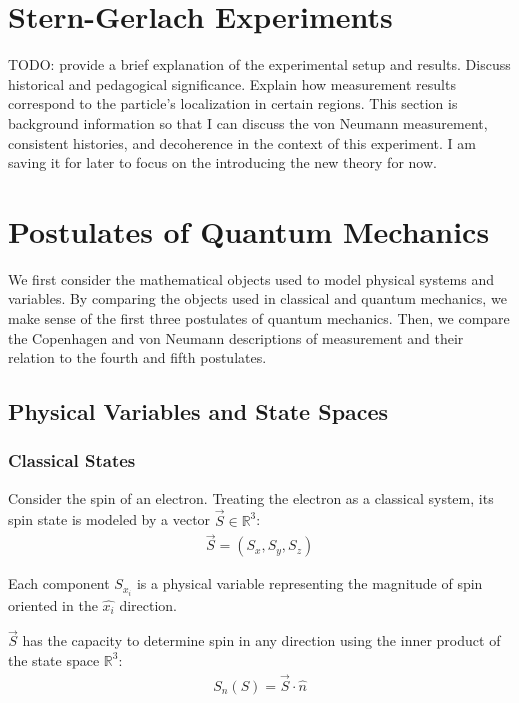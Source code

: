 \usetikzlibrary{shapes.geometric}
\usetikzlibrary{positioning}

\newcommand{\apparatus}[4]{\node[square node] (#1) at (#2,#3){#4};
                           \node[port] (#1+) at (#2 + 0.375, #3 + 0.5){+};
                           \node[port] (#1-) at (#2 + 0.375, #3 - 0.5){-};}

\chapter{Stern-Gerlach Experiments}
TODO: provide a brief explanation of the experimental setup and results. Discuss historical and pedagogical significance. Explain how measurement results correspond to the particle's localization in certain regions. This section is background information so that I can discuss the von Neumann measurement, consistent histories, and decoherence in the context of this experiment. I am saving it for later to focus on the introducing the new theory for now.

\chapter{Postulates of Quantum Mechanics}

We first consider the mathematical objects used to model physical systems and variables. By comparing the objects used in classical and quantum mechanics, we make sense of the first three postulates of quantum mechanics. Then, we compare the Copenhagen and von Neumann descriptions of measurement and their relation to the fourth and fifth postulates.

\section{Physical Variables and State Spaces}
\subsection{Classical States}
Consider the spin of an electron. Treating the electron as a classical system, its spin state is modeled by a vector $\vec{S} \in \mathbb{R}^3$:
\begin{align}
\vec{S} = (S_x, S_y, S_z)
\end{align}

Each component $S_{x_i}$ is a physical variable representing the magnitude of spin oriented in the $\hat{x_i}$ direction.

$\vec{S}$ has the capacity to determine spin in any direction using the inner product of the state space $\mathbb{R}^3$:
\begin{align}
S_n(S) = \vec{S} \cdot \hat{n}
\end{align}

